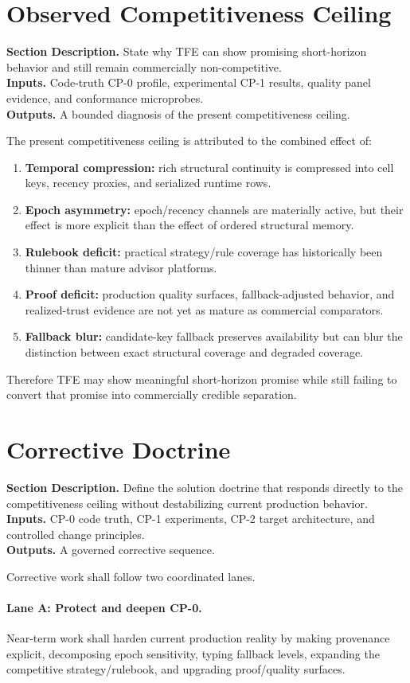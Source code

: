 \documentclass[11pt]{report}
\newcommand{\meta}[3]{\textbf{Section Description.} #1\\
\textbf{Inputs.} #2\\
\textbf{Outputs.} #3\par}
\begin{document}
\section{Observed Competitiveness Ceiling}
\meta{State why TFE can show promising short-horizon behavior and still remain commercially non-competitive.}{Code-truth CP-0 profile, experimental CP-1 results, quality panel evidence, and conformance microprobes.}{A bounded diagnosis of the present competitiveness ceiling.}

The present competitiveness ceiling is attributed to the combined effect of:
\begin{enumerate}[leftmargin=1.2cm]
    \item \textbf{Temporal compression:} rich structural continuity is compressed into cell keys, recency proxies, and serialized runtime rows.
    \item \textbf{Epoch asymmetry:} epoch/recency channels are materially active, but their effect is more explicit than the effect of ordered structural memory.
    \item \textbf{Rulebook deficit:} practical strategy/rule coverage has historically been thinner than mature advisor platforms.
    \item \textbf{Proof deficit:} production quality surfaces, fallback-adjusted behavior, and realized-trust evidence are not yet as mature as commercial comparators.
    \item \textbf{Fallback blur:} candidate-key fallback preserves availability but can blur the distinction between exact structural coverage and degraded coverage.
\end{enumerate}
Therefore TFE may show meaningful short-horizon promise while still failing to convert that promise into commercially credible separation.

\section{Corrective Doctrine}
\meta{Define the solution doctrine that responds directly to the competitiveness ceiling without destabilizing current production behavior.}{CP-0 code truth, CP-1 experiments, CP-2 target architecture, and controlled change principles.}{A governed corrective sequence.}

Corrective work shall follow two coordinated lanes.
\paragraph{Lane A: Protect and deepen CP-0.}
Near-term work shall harden current production reality by making provenance explicit, decomposing epoch sensitivity, typing fallback levels, expanding the competitive strategy/rulebook, and upgrading proof/quality surfaces.
\end{document}

